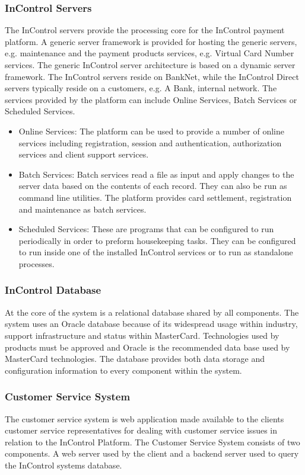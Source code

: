 \documentclass[a4paper, 11pt, titlepage]{article}
\begin{document}
\subsubsection{InControl Servers} 
The InControl servers provide the processing core for the InControl payment platform. A generic server framework is provided for hosting the generic servers, e.g. maintenance and the payment products services, e.g. Virtual Card Number services. The generic InControl server architecture is based on a dynamic server framework. The InControl servers reside on BankNet, while the InControl Direct servers typically reside on a customers, e.g. A Bank, internal network. The services provided by the platform can include Online Services, Batch Services or Scheduled Services. 
\begin{itemize} 
\item Online Services: The platform can be used to provide a number of online services including registration, session and authentication, authorization services and client support services. 
\item Batch Services: Batch services read a file as input and apply changes to the server data based on the contents of each record. They can also be run as command line utilities. The platform provides card settlement, registration and maintenance as batch services. 
\item Scheduled Services: These are programs that can be configured to run periodically in order to preform housekeeping tasks. They can be configured to run inside one of the installed InControl services or to run as standalone processes. 
\end{itemize} 
\subsubsection{InControl Database} At the core of the system is a relational database shared by all components. The system uses an Oracle database because of its widespread usage within industry, support infrastructure and status within MasterCard. Technologies used by products must be approved and Oracle is the recommended data base used by MasterCard technologies. The database provides both data storage and configuration information to every component within the system. 
\subsubsection{Customer Service System} The customer service system is web application made available to the clients customer service representatives for dealing with customer service issues in relation to the InControl Platform. The Customer Service System consists of two components. A web server used by the client and a backend server used to query the InControl systems database. 
\end{document}
